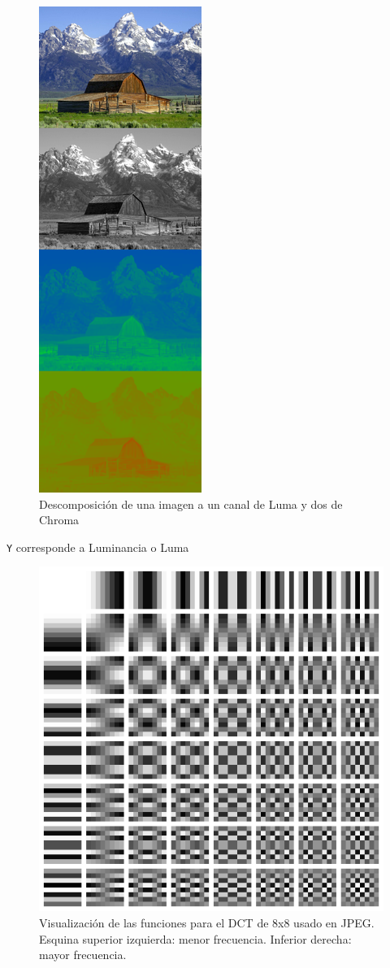 \begin{figure}
    \includegraphics{yuv}
    \caption{Descomposición de una imagen a un canal de Luma y dos de Chroma}
\end{figure}


\verb+Y+ corresponde a Luminancia o Luma


\begin{figure}[hb] %
    \includegraphics{DCT-8x8}
    \caption{Visualización de las funciones para el DCT de 8x8 usado en JPEG. Esquina superior izquierda: menor frecuencia. Inferior derecha: mayor frecuencia.}
\end{figure}

%
